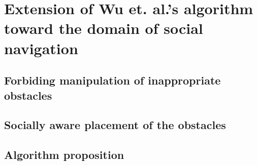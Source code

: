 
\chapter{Extension of Wu et. al.'s algorithm toward the domain of social navigation} %

\label{Chapter4} %

\section{Forbiding manipulation of inappropriate obstacles}

\section{Socially aware placement of the obstacles}

\section{Algorithm proposition}
